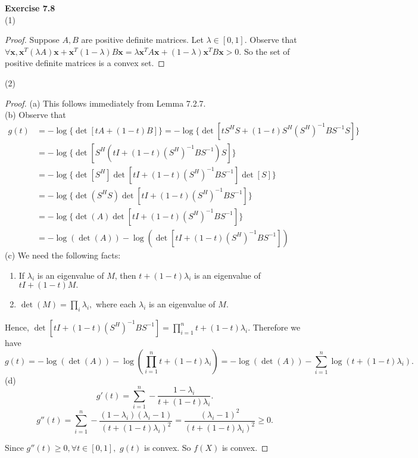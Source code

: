 \documentclass[letterpaper,12pt]{article}
\theoremstyle{definition}
\renewcommand{\vec}[1]{\mathbf{#1}}
\begin{document}
\noindent\textbf{Exercise 7.8} \\
(1)
\begin{proof}
Suppose $A, B$ are positive definite matrices. Let $\lambda \in [0,1].$ Observe that $\forall \vec{x} , \vec{x} ^T (\lambda A) \vec{x}   + \vec{x} ^T (1-\lambda)B \vec{x}  = \lambda \vec{x} ^T A \vec{x}  + (1-\lambda) \vec{x} ^T B \vec{x} > 0.$ So the set of positive definite matrices is a convex set.
\end{proof}
(2)
\begin{proof}
  (a) This follows immediately from Lemma 7.2.7.\\
  (b) Observe that
  \begin{align*}
    g(t) &= -\log\{ \det[tA+(1-t)B]\} = -\log \{ \det[t S^H S+(1-t) S^H (S^H)^{-1} B S^{-1}S]\}\\
    &= -\log\{\det[S^H (tI+ (1-t)(S^H)^{-1} B S^{-1})S]\} \\
    &= -\log\{ \det[S^H] \det[tI+ (1-t)(S^H)^{-1} B S^{-1}] \det[S] \}\\
    &= -\log\{\det(S^H S) \det[tI+ (1-t)(S^H)^{-1} B S^{-1}] \} \\
    &= -\log\{\det(A) \det[tI+ (1-t)(S^H)^{-1} B S^{-1}] \} \\
    &= -\log(\det(A)) - \log(\det[tI+ (1-t)(S^H)^{-1} B S^{-1}])
  \end{align*}
  (c) We need the following facts:
  \begin{enumerate}
    \item If $\lambda_i$ is an eigenvalue of $M$, then $t+ (1-t)\lambda_i$ is an eigenvalue of $tI + (1-t)M.$
    \item $\det(M) = \prod_{i} \lambda_i,$ where each $\lambda_i$ is an eigenvalue of $M.$
  \end{enumerate}
  Hence, $\det[tI+ (1-t)(S^H)^{-1} B S^{-1}] = \prod_{i=1}^n t+ (1-t)\lambda_i.$ Therefore we have
  $$g(t) = -\log(\det(A)) - \log(\prod_{i=1}^n t+ (1-t)\lambda_i) = -\log(\det(A)) - \sum_{i=1}^n \log(t+ (1-t)\lambda_i).$$
  (d) $$g'(t) = \sum_{i=1}^{n} -\frac{1-\lambda_i}{t+(1-t)\lambda_i}.$$
  $$g''(t) = \sum_{i=1}^{n} -\frac{(1-\lambda_i)(\lambda_i-1)}{(t+(1-t)\lambda_i)^2} = \frac{(\lambda_i-1)^2}{(t+(1-t)\lambda_i)^2} \geq 0.$$

  Since $g''(t) \geq 0, \forall t \in [0,1],$ $g(t)$ is convex. So  $f(X)$ is convex.
\end{proof}
\end{document}
